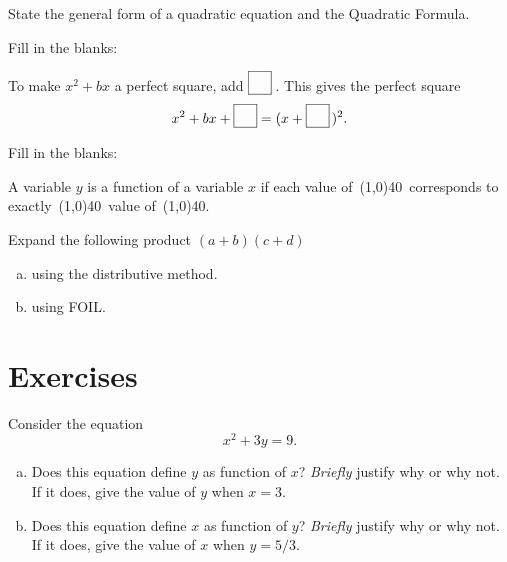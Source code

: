 \documentclass[12pt]{amsart}
\begin{document}
\newpage

\begin{thm}[2 Points]\label{ex3}
  State the general form of a quadratic equation and the Quadratic Formula.
  \vspace{1in}
\end{thm}

\begin{thm}[3 Points]\label{ex4}
  Fill in the blanks:\\
  \begin{center}
    To make $x^2 + bx$ a perfect square, add $\fbox{\raisebox{10px}{\hspace{10px}}}$\,.
    This gives the perfect square
    $$x^2 + bx + \fbox{\raisebox{10px}{\hspace{10px}}} = (x + \fbox{\raisebox{10px}{\hspace{10px}}}\,)^2.$$
  \end{center}
\end{thm}

\begin{thm}[3 Points]\label{ex5}
  Fill in the blanks:\\
  \begin{center}
    A variable $y$ is a function of a variable $x$ if each value of\ \line(1,0){40}\ corresponds to exactly\ \line(1,0){40}\ value of\ \line(1,0){40}.
  \end{center}
  \vspace{1in}
\end{thm}

\begin{thm}[3 Points]\label{ex6}
  Expand the following product $(a + b)(c + d)$
  \begin{enumerate}[(a)]
    \item
      using the distributive method.
      \vspace{1in}
    \item
      using FOIL.
      \vspace{1in}
  \end{enumerate}
\end{thm}

\newpage
\section{Exercises}
\begin{thm}[20 Points]\label{ex7}
  Consider the equation
  $$x^2 + 3y = 9.$$
  \begin{enumerate}[(a)]
    \item
      Does this equation define $y$ as function of $x$?  
      {\it Briefly} justify why or why not.
      If it does, give the value of $y$ when $x = 3$.
      \vspace{1in}
    \item
      Does this equation define $x$ as function of $y$?  {\it Briefly} justify why or why not.
      If it does, give the value of $x$ when $y = 5/3$.
      \vspace{1in}
  \end{enumerate}
\end{thm}
\end{document}
